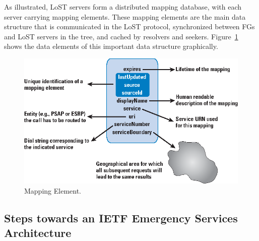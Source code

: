 \documentclass[12pt]{article}
\begin{document}
As illustrated, LoST servers form a distributed mapping database, with each server carrying mapping elements. These mapping elements are the main data structure that is communicated in the LoST protocol, synchronized between FGs and LoST servers in the tree, and cached by resolvers and seekers. Figure~\ref{ietf-mapping-element-figure} shows the data elements of this important data structure graphically.

\begin{figure}[!t]
 \centering
 \includegraphics[scale=0.80]{figures/ietf-mapping-element-figure.eps}
 \caption{Mapping Element.}
 \label{ietf-mapping-element-figure}
\end{figure}

\subsection{Steps towards an IETF Emergency Services Architecture}
\end{document}
